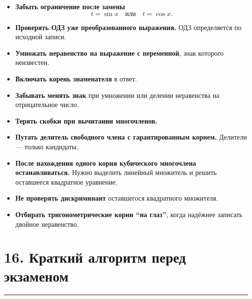 \documentclass[a4paper,12pt]{article}
\newcommand{\sectionline}{%
    \vspace{0.2em}
    \noindent\color{linegray}\rule{\linewidth}{0.6pt}
    \vspace{0.4em}
}
\begin{document}
\begin{itemize}
    \item \textbf{Забыть ограничение после замены}
    \[
    t=\sin x
    \quad\text{или}\quad
    t=\cos x.
    \]

    \item \textbf{Проверять ОДЗ уже преобразованного выражения.}
    ОДЗ определяется по исходной записи.

    \item \textbf{Умножать неравенство на выражение с переменной}, знак которого неизвестен.

    \item \textbf{Включать корень знаменателя} в ответ.

    \item \textbf{Забывать менять знак} при умножении или делении неравенства на отрицательное число.

    \item \textbf{Терять скобки при вычитании многочленов.}

    \item \textbf{Путать делитель свободного члена с гарантированным корнем.}
    Делители --- только кандидаты.

    \item \textbf{После нахождения одного корня кубического многочлена останавливаться.}
    Нужно выделить линейный множитель и решить оставшееся квадратное уравнение.

    \item \textbf{Не проверять дискриминант} оставшегося квадратного множителя.

    \item \textbf{Отбирать тригонометрические корни ``на глаз''}, когда надёжнее записать двойное неравенство.
\end{itemize}

\section*{\color{darkaccent}16. Краткий алгоритм перед экзаменом}
\sectionline
\end{document}
